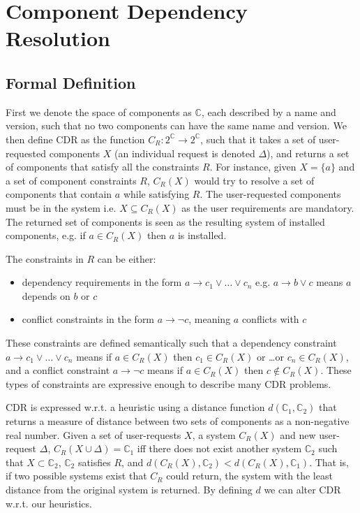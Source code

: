\chapter{Component Dependency Resolution}

\section{Formal Definition}
First we denote the space of components as $\mathbb{C}$, each described by a name and version, such that no two components can have the same name and version.
We then define CDR as the function $C_R: 2^\mathbb{C} \rightarrow 2^\mathbb{C}$, 
such that it takes a set of user-requested components $X$ (an individual request is denoted $\Delta$),
and returns a set of components that satisfy all the constraints $R$.
For instance, given $X = \{a\}$ and a set of component constraints $R$,
$C_R(X)$ would try to resolve a set of components that contain $a$ while satisfying $R$.
The user-requested components must be in the system i.e. $X \subseteq C_R(X)$ as the user requirements are mandatory.
The returned set of components is seen as the resulting system of installed components, e.g. if $a \in C_R(X)$ then $a$ is installed.

The constraints in $R$ can be either: 
\begin{itemize}
  \item dependency requirements in the form $a \rightarrow c_1 \vee \ldots \vee c_n$ e.g. $a \rightarrow b \vee c$ means $a$ depends on $b$ or $c$
  \item conflict constraints in the form $a \rightarrow \neg c$, meaning $a$ conflicts with $c$
\end{itemize}
These constraints are defined semantically such that
a dependency constraint $a \rightarrow c_1 \vee \ldots \vee c_n$ means if $a \in C_R(X)$ then $c_1 \in C_R(X)$ or \ldots or $c_n \in C_R(X)$,
and a conflict constraint $a \rightarrow \neg c$ means if $a \in C_R(X)$ then $c \not \in C_R(X)$.
These types of constraints are expressive enough to describe many CDR problems.

CDR is expressed w.r.t. a heuristic using a distance function $d(\mathbb{C}_1,\mathbb{C}_2)$ 
that returns a measure of distance between two sets of components as a non-negative real number.
Given a set of user-requests $X$, a system $C_R(X)$ and new user-request $\Delta$,
$C_R(X \cup \Delta) = \mathbb{C}_1$ iff there does not exist another system $\mathbb{C}_2$ such that $X \subset \mathbb{C}_2$, $\mathbb{C}_2$ satisfies $R$, 
and $d(C_R(X),\mathbb{C}_2) < d(C_R(X),\mathbb{C}_1)$.
That is, if two possible systems exist that $C_R$ could return, the system with the least distance from the original system is returned. 
By defining $d$ we can alter CDR w.r.t. our heuristics.

